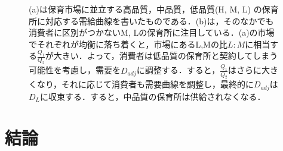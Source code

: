 \documentclass[
]{ltjarticle}
\begin{document}
\begin{figure}%
    \centering
    \qquad
    \caption{(a)は保育市場に並立する高品質，中品質，低品質(H, M, L) の保育所に対応する需給曲線を書いたものである．(b)は，そのなかでも消費者に区別がつかないM, Lの保育所に注目している．(a)の市場でそれぞれが均衡に落ち着くと，市場にあるL,Mの比$L:M$に相当する$\frac{Q_1}{Q_2}$が大きい．よって，消費者は低品質の保育所と契約してしまう可能性を考慮し，需要を$D_{adj}$に調整する．すると，$\frac{Q_1}{Q_2}$はさらに大きくなり，それに応じて消費者も需要曲線を調整し，最終的に$D_{adj}$は$D_L$に収束する．すると，中品質の保育所は供給されなくなる．}
    \label{fig:example}%
\end{figure}
\newpage

\hypertarget{ux7d50ux8ad6}{%
\section{結論}\label{ux7d50ux8ad6}}
\end{document}

